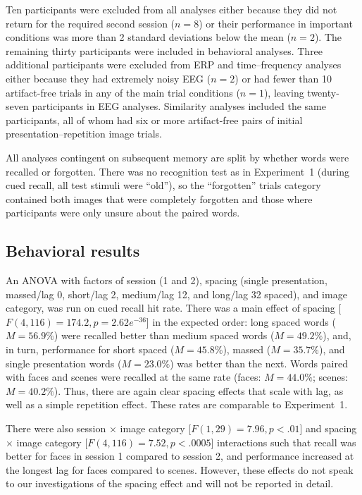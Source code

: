 

Ten participants were excluded from all analyses either because they did not return for the required second session ($n=8$) or their performance in important conditions was more than 2 standard deviations below the mean ($n=2$).  The remaining thirty participants were included in behavioral analyses.
Three additional participants were excluded from ERP and time--frequency analyses either because they had extremely noisy EEG ($n=2$) or had fewer than 10 artifact-free trials in any of the main trial conditions ($n=1$), leaving twenty-seven participants in EEG analyses.  Similarity analyses included the same participants, all of whom had six or more artifact-free pairs of initial presentation--repetition image trials.

All analyses contingent on subsequent memory are split by whether words were recalled or forgotten.  There was no recognition test as in Experiment~1 (during cued recall, all test stimuli were ``old''), so the ``forgotten'' trials category contained both images that were completely forgotten and those where participants were only unsure about the paired words.

\subsection{Behavioral results}

An ANOVA with factors of session (1 and 2), spacing (single presentation, massed/lag 0, short/lag 2, medium/lag 12, and long/lag 32 spaced), and image category, was run on cued recall hit rate.  There was a main effect of spacing [$F(4,116)=174.2, p=2.62e^{-36}$] in the expected order: long spaced words ($M=56.9\%$) were recalled better than medium spaced words ($M=49.2\%$), and, in turn, performance for short spaced ($M=45.8\%$), massed ($M=35.7\%$), and single presentation words ($M=23.0\%$) was better than the next.  Words paired with faces and scenes were recalled at the same rate (faces: $M=44.0\%$; scenes: $M=40.2\%$).  Thus, there are again clear spacing effects that scale with lag, as well as a simple repetition effect. These rates are comparable to Experiment~1.

There were also session $\times$ image category [$F(1,29)=7.96, p<.01$] and spacing $\times$ image category [$F(4,116)=7.52, p<.0005$] interactions such that recall was better for faces in session 1 compared to session 2, and performance increased at the longest lag for faces compared to scenes.  However, these effects do not speak to our investigations of the spacing effect and will not be reported in detail.

